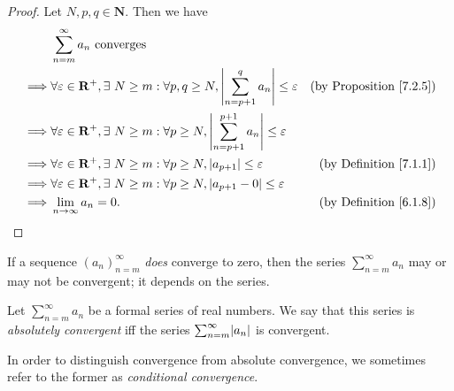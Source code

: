 \begin{proof}
    Let \(N, p, q \in \mathbf{N}\).
    Then we have
    \begin{align*}
                 & \sum_{n = m}^\infty a_n \text{ converges}                                                                                                                              \\
        \implies & \forall \varepsilon \in \mathbf{R}^+, \exists\ N \geq m : \forall p, q \geq N, \abs*{\sum_{n = p + 1}^q a_n} \leq \varepsilon    & \text{(by Proposition \ref{7.2.5})} \\
        \implies & \forall \varepsilon \in \mathbf{R}^+, \exists\ N \geq m : \forall p \geq N, \abs*{\sum_{n = p + 1}^{p + 1} a_n} \leq \varepsilon                                       \\
        \implies & \forall \varepsilon \in \mathbf{R}^+, \exists\ N \geq m : \forall p \geq N, \abs*{a_{p + 1}} \leq \varepsilon                    & \text{(by Definition \ref{7.1.1})}  \\
        \implies & \forall \varepsilon \in \mathbf{R}^+, \exists\ N \geq m : \forall p \geq N, \abs*{a_{p + 1} - 0} \leq \varepsilon                                                      \\
        \implies & \lim_{n \to \infty} a_n = 0.                                                                                                     & \text{(by Definition \ref{6.1.8})}
    \end{align*}
\end{proof}

\begin{note}
    If a sequence \((a_n)_{n = m}^\infty\) \emph{does} converge to zero, then the series \(\sum_{n = m}^\infty a_n\) may or may not be convergent;
    it depends on the series.
\end{note}

\setcounter{theorem}{7}
\begin{definition}\label{7.2.8}
    Let \(\sum_{n = m}^\infty a_n\) be a formal series of real numbers.
    We say that this series is \emph{absolutely convergent} iff the series \(\sum_{n = m}^\infty \abs*{a_n}\) is convergent.
\end{definition}

\begin{note}
    In order to distinguish convergence from absolute convergence, we sometimes refer to the former as \emph{conditional convergence}.
\end{note}

